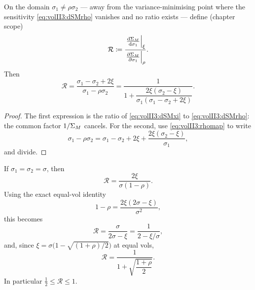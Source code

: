 \begin{proposition}
\label{prop:volII3:ratio}
On the domain $\sigma_1 \ne \rho\sigma_2$ --- away from the
variance-minimising point where the \stickyrho{} sensitivity
\eqref{eq:volII3:dSMrho} vanishes and no ratio exists --- define (chapter
scope)
\begin{equation}\label{eq:volII3:Rdef}
\mathcal{R} \coloneqq
\frac{\left.\frac{\mathrm{d} \Sigma_M}{\mathrm{d} \sigma_1}\right|_{\xi}}
     {\left.\frac{\partial \Sigma_M}{\partial \sigma_1}\right|_{\rho}} .
\end{equation}
Then
\begin{equation}\label{eq:volII3:Rexact}
\mathcal{R} = \frac{\sigma_1 - \sigma_2 + 2\xi}{\sigma_1 - \rho\sigma_2}
= \frac{1}{1 + \dfrac{2\xi(\sigma_2 - \xi)}
                     {\sigma_1(\sigma_1 - \sigma_2 + 2\xi)}} .
\end{equation}
\end{proposition}

\begin{proof}
The first expression is the ratio of \eqref{eq:volII3:dSMxi} to
\eqref{eq:volII3:dSMrho}: the common factor $1/\Sigma_M$ cancels. For the
second, use \eqref{eq:volII3:rhomap} to write
\begin{equation}\label{eq:volII3:denom}
\sigma_1 - \rho\sigma_2
= \sigma_1 - \sigma_2 + 2\xi + \frac{2\xi(\sigma_2 - \xi)}{\sigma_1},
\end{equation}
and divide.
\end{proof}

\begin{corollary}\label{cor:volII3:equalvol}
If $\sigma_1 = \sigma_2 = \sigma$, then
\begin{equation}\label{eq:volII3:Requalvol}
\mathcal{R} = \frac{2\xi}{\sigma(1 - \rho)} .
\end{equation}
Using the exact equal-vol identity
\begin{equation}\label{eq:volII3:equalvolxi}
1 - \rho = \frac{2\xi(2\sigma - \xi)}{\sigma^2},
\end{equation}
this becomes
\begin{equation}\label{eq:volII3:Rsimple}
\mathcal{R} = \frac{\sigma}{2\sigma - \xi} = \frac{1}{2 - \xi/\sigma},
\end{equation}
and, since $\xi = \sigma\bigl(1 - \sqrt{(1 + \rho)/2}\bigr)$ at equal vols,
\begin{equation}\label{eq:volII3:Rrho}
\mathcal{R} = \frac{1}{1 + \sqrt{\dfrac{1 + \rho}{2}}} .
\end{equation}
In particular $\tfrac12 \le \mathcal{R} \le 1$.
\end{corollary}

